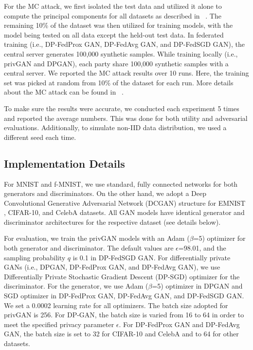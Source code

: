   For the MC attack, we first isolated the test data and utilized it alone to compute the principal components for all datasets as described in ~\cite{PrivGAN2019, MCAttackHilprecht2019}. The remaining 10\% of the dataset was then utilized for training models, with the model being tested on all data except the held-out test data. In federated training (i.e.,  DP-FedProx GAN, DP-FedAvg GAN, and DP-FedSGD GAN), the central server generates 100,000 synthetic samples. While training locally (i.e., privGAN and DPGAN), each party share 100,000 synthetic samples with a central server. We reported the MC attack results over 10 runs. Here, the training set was picked at random from 10\% of the dataset for each run. More details about the MC attack can be found in ~\cite{MCAttackHilprecht2019}. 
 
To make sure the results were accurate, we conducted each experiment 5 times and reported the average numbers. This was done for both utility and adversarial evaluations. Additionally, to simulate non-IID data distribution, we used a different seed each time.




\subsection{Implementation Details}


For MNIST and f-MNIST, we use standard, fully connected networks for both generators and discriminators. On the other hand, we adopt a Deep Convolutional Generative Adversarial Network (DCGAN) structure for EMNIST \cite{cohen2017emnist}, CIFAR-10, and CelebA datasets. All GAN models have identical generator and discriminator architectures for the respective dataset (see details below).



For evaluation, we train the privGAN models with an Adam ($\beta$=5) optimizer for both generator and discriminator. The default values are $\epsilon$=98.01,  and the sampling probability $q$ is 0.1 in DP-FedSGD GAN. For differentially private GANs (i.e., DPGAN, DP-FedProx GAN, and DP-FedAvg GAN), we use Differentially Private Stochastic Gradient Descent (DP-SGD) optimizer for the discriminator. For the generator, we use  Adam ($\beta$=5) optimizer in DPGAN and SGD optimizer in DP-FedProx GAN, DP-FedAvg GAN, and DP-FedSGD GAN.  We set a 0.0002 learning rate for all optimizers.  The batch size adopted for privGAN is 256.  For DP-GAN, the batch size is varied from 16 to 64 in order to meet the specified privacy parameter $\epsilon$.  For DP-FedProx GAN and DP-FedAvg GAN, the batch size is set to 32 for CIFAR-10 and CelebA and to 64 for other datasets.  


